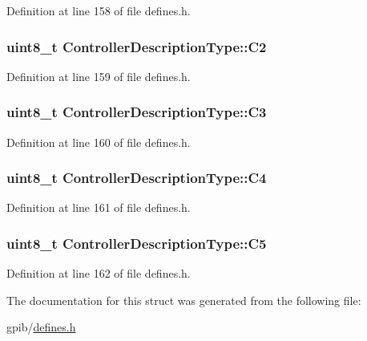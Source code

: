 Definition at line 158 of file defines.\+h.

\subsubsection[{\texorpdfstring{C2}{C2}}]{\setlength{\rightskip}{0pt plus 5cm}uint8\+\_\+t Controller\+Description\+Type\+::\+C2}\hypertarget{structControllerDescriptionType_ae2ac8a001bde9c68f92c6bb3a7287517}{}\label{structControllerDescriptionType_ae2ac8a001bde9c68f92c6bb3a7287517}


Definition at line 159 of file defines.\+h.

\subsubsection[{\texorpdfstring{C3}{C3}}]{\setlength{\rightskip}{0pt plus 5cm}uint8\+\_\+t Controller\+Description\+Type\+::\+C3}\hypertarget{structControllerDescriptionType_ad24f2f797685ffd8f0bc96a800e5a6a8}{}\label{structControllerDescriptionType_ad24f2f797685ffd8f0bc96a800e5a6a8}


Definition at line 160 of file defines.\+h.

\subsubsection[{\texorpdfstring{C4}{C4}}]{\setlength{\rightskip}{0pt plus 5cm}uint8\+\_\+t Controller\+Description\+Type\+::\+C4}\hypertarget{structControllerDescriptionType_abc2badc5707de3327d15a00919fb7e08}{}\label{structControllerDescriptionType_abc2badc5707de3327d15a00919fb7e08}


Definition at line 161 of file defines.\+h.

\subsubsection[{\texorpdfstring{C5}{C5}}]{\setlength{\rightskip}{0pt plus 5cm}uint8\+\_\+t Controller\+Description\+Type\+::\+C5}\hypertarget{structControllerDescriptionType_a5b520889371f53fb89e36a0de5f071e9}{}\label{structControllerDescriptionType_a5b520889371f53fb89e36a0de5f071e9}


Definition at line 162 of file defines.\+h.



The documentation for this struct was generated from the following file\+:\begin{DoxyCompactItemize}
\item 
gpib/\hyperlink{defines_8h}{defines.\+h}\end{DoxyCompactItemize}
